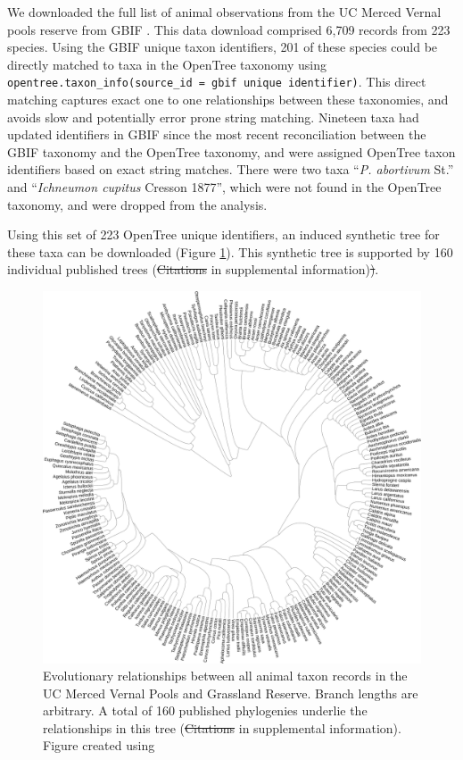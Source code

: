 \documentclass[oupdraft]{sysbio_sse}
\providecommand{\DIFadd}[1]{{\protect\color{blue}\uwave{#1}}} %
\providecommand{\DIFdel}[1]{{\protect\color{red}\sout{#1}}}                      %
\providecommand{\DIFaddbegin}{} %
\providecommand{\DIFaddend}{} %
\providecommand{\DIFdelbegin}{} %
\providecommand{\DIFdelend}{} %
\providecommand{\DIFaddFL}[1]{\DIFadd{#1}} %
\providecommand{\DIFdelFL}[1]{\DIFdel{#1}} %
\providecommand{\DIFaddbeginFL}{} %
\providecommand{\DIFaddendFL}{} %
\providecommand{\DIFdelbeginFL}{} %
\providecommand{\DIFdelendFL}{} %
\begin{document}
We downloaded the full list of animal observations from the UC Merced Vernal pools reserve from GBIF \citep{gbif_secretariat_gbif_2019}. This data download comprised 6,709 records from 223 species. Using the GBIF unique taxon identifiers, 201 of these species could be directly matched to taxa in the OpenTree taxonomy using \texttt{opentree.taxon\_info(source\_id = {gbif unique identifier})}. This direct matching captures exact one to one relationships between these taxonomies, and avoids slow and potentially error prone string matching. Nineteen taxa had updated identifiers in GBIF since the most recent reconciliation between the GBIF taxonomy and the OpenTree taxonomy, and were assigned OpenTree taxon identifiers based on exact string matches. There were two taxa ``\textit{P. abortivum} St.'' and ``\textit{Ichneumon cupitus} Cresson 1877'', which were not found in the OpenTree taxonomy, and were dropped from the analysis.


Using this set of 223 OpenTree unique identifiers, an induced synthetic tree for these taxa can be downloaded (Figure \ref{vernalanimals}). This synthetic tree is supported by 160 individual published trees (\DIFdelbegin \DIFdel{Citations }\DIFdelend \DIFaddbegin \DIFadd{citations }\DIFaddend in supplemental information)\DIFdelbegin \DIFdel{)}\DIFdelend .

\begin{figure}[!h]
\centering\includegraphics[width=\textwidth]{vernal_animals}
\caption{Evolutionary relationships between all animal taxon records in the UC Merced Vernal Pools and Grassland Reserve. Branch lengths are arbitrary. A total of 160 published phylogenies underlie the relationships in this tree (\DIFdelbeginFL \DIFdelFL{Citations }\DIFdelendFL \DIFaddbeginFL \DIFaddFL{citations }\DIFaddendFL in supplemental information). Figure created using \DIFaddbeginFL \DIFaddFL{using iTOL v4 }\DIFaddendFL \citep{letunic_interactive_2019}\DIFaddbeginFL \DIFaddFL{.}\DIFaddendFL }
\label{vernalanimals}
\end{figure}
\end{document}
